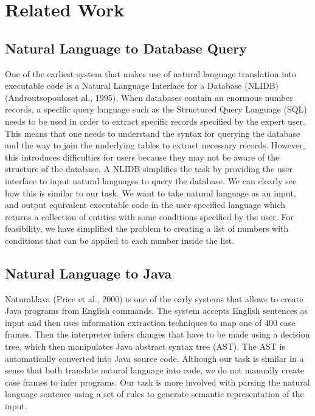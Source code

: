 \documentclass[11pt,letterpaper]{article}
\begin{document}

\section{Related Work}

\subsection{Natural Language to Database Query}

One of the earliest system that makes use of natural language translation into executable code is a Natural Language Interface
for a Database (NLIDB) (Androutsopouloset al., 1995). When databases contain an enormous number records, a specific query language such as the Structured Query Language (SQL) needs to be used in order to extract specific records specified by the expert user. This means that one needs to understand the syntax for querying the database and the way to join the underlying tables to extract necessary records. However, this introduces difficulties for users because they may not be aware of the structure of the database. A NLIDB simplifies the task by providing the user interface to input natural languages to query the database. We can clearly see how this is similar to our task. We want to take natural language as an input, and output equivalent executable code in the user-specified language which returns a collection of entities with some conditions specified by the user. For feasibility, we have simplified the problem to creating a list of numbers with conditions that can be applied to each number inside the list.   

\subsection{Natural Language to Java}
NaturalJava (Price et al., 2000) is one of the early systems that 
allows to create Java programs from English commands. The system accepts English sentences as input and then uses information extraction techniques to map one of 400 case frames. Then the interpreter infers changes that have to be made using a decision tree, which then manipulates Java abstract syntax tree (AST). The AST is automatically converted into Java source code. Although our task is similar in a sense that both translate natural language into code, we do not manually create case frames to infer programs. Our task is more involved with parsing the natural language sentence using a set of rules to generate semantic representation of the input.
\end{document}
